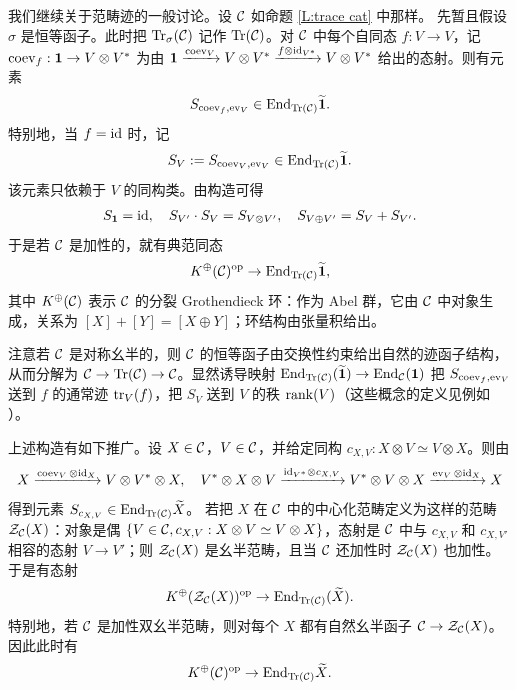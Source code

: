我们继续关于范畴迹的一般讨论。设 ${\mathcal C}$ 如命题 \ref{L:trace cat} 中那样。
先暂且假设 $\sigma$ 是恒等函子。此时把 ${\operatorname{Tr}}_\sigma({\mathcal C})$ 记作 ${\operatorname{Tr}}({\mathcal C})$。对 ${\mathcal C}$ 中每个自同态 $f: V\to V$，记 $\operatorname{coev}_f:\mathbf{1}\to V\otimes V^*$ 为由 $\mathbf{1}\xrightarrow{\operatorname{coev}_V}V\otimes V^*\xrightarrow{f\otimes{\operatorname{id}}_{V^*}}V\otimes V^*$ 给出的态射。则有元素
\[S_{\operatorname{coev}_f,\operatorname{ev}_V}\in {\operatorname{End}}_{{\operatorname{Tr}}({\mathcal C})}\widetilde{\mathbf{1}}.\]
特别地，当 $f={\operatorname{id}}$ 时，记
\begin{equation}
\label{E:abs S}
S_V:=S_{\operatorname{coev}_{V},\operatorname{ev}_{V}}\in {\operatorname{End}}_{{\operatorname{Tr}}({\mathcal C})}\widetilde{\mathbf{1}}.
\end{equation}
该元素只依赖于 $V$ 的同构类。由构造可得
\[S_{\mathbf{1}}={\operatorname{id}},\quad S_{V'}\cdot S_{V}=S_{V\otimes V'},\quad S_{V\oplus V'}=S_V+S_{V'}.\]
于是若 ${\mathcal C}$ 是加性的，就有典范同态
\begin{equation}
\label{E: K to End}
K^{\oplus}({\mathcal C})^{\operatorname{op}}\to {\operatorname{End}}_{{\operatorname{Tr}}({\mathcal C})}\widetilde{\mathbf{1}},
\end{equation}
其中 $K^{\oplus}({\mathcal C})$ 表示 ${\mathcal C}$ 的分裂 Grothendieck 环：作为 Abel 群，它由 ${\mathcal C}$ 中对象生成，关系为 $[X]+[Y]=[X\oplus Y]$；环结构由张量积给出。

\begin{rmk}
注意若 ${\mathcal C}$ 是对称幺半的，则 ${\mathcal C}$ 的恒等函子由交换性约束给出自然的迹函子结构，从而分解为 ${\mathcal C}\to {\operatorname{Tr}}({\mathcal C})\to {\mathcal C}$。显然诱导映射 ${\operatorname{End}}_{{\operatorname{Tr}}({\mathcal C})}(\widetilde{\mathbf{1}})\to {\operatorname{End}}_{\mathcal C}(\mathbf{1})$ 把 $S_{\operatorname{coev}_f,\operatorname{ev}_V}$ 送到 $f$ 的通常迹 ${\operatorname{tr}}_V(f)$，把 $S_V$ 送到 $V$ 的秩 $\operatorname{rank}(V)$（这些概念的定义见例如 \cite[(1.7.3)]{DM}）。
\end{rmk}

上述构造有如下推广。设 $X\in {\mathcal C}$，$V\in {\mathcal C}$，并给定同构 $c_{X,V}: X\otimes V\simeq V\otimes X$。则由
\[X\xrightarrow{\operatorname{coev}_V\otimes{\operatorname{id}}_X}V\otimes V^*\otimes X, \quad V^*\otimes X\otimes V\xrightarrow{{\operatorname{id}}_{V^*}\otimes c_{X,V}} V^*\otimes V\otimes X\xrightarrow{\operatorname{ev}_V\otimes {\operatorname{id}}_X} X\]
得到元素 $S_{c_{X,V}}\in {\operatorname{End}}_{{\operatorname{Tr}}({\mathcal C})}\widetilde{X}$。
若把 $X$ 在 ${\mathcal C}$ 中的中心化范畴定义为这样的范畴 ${\mathcal Z}_{{\mathcal C}}(X)$：对象是偶 $\{V\in{\mathcal C}, c_{X,V}: X\otimes V\simeq V\otimes X\}$，态射是 ${\mathcal C}$ 中与 $c_{X,V}$ 和 $c_{X,V'}$ 相容的态射 $V\to V'$；则 ${\mathcal Z}_{{\mathcal C}}(X)$ 是幺半范畴，且当 ${\mathcal C}$ 还加性时 ${\mathcal Z}_{{\mathcal C}}(X)$ 也加性。于是有态射
\begin{equation}
\label{E: K to End2}
K^{\oplus}({\mathcal Z}_{{\mathcal C}}(X))^{\operatorname{op}}\to {\operatorname{End}}_{{\operatorname{Tr}}({\mathcal C})}(\widetilde X).
\end{equation}
特别地，若 ${\mathcal C}$ 是加性双幺半范畴，则对每个 $X$ 都有自然幺半函子 ${\mathcal C}\to {\mathcal Z}_{\mathcal C}(X)$。因此此时有
$$K^{\oplus}({\mathcal C})^{\operatorname{op}}\to {\operatorname{End}}_{{\operatorname{Tr}}({\mathcal C})}\widetilde{X}.$$

